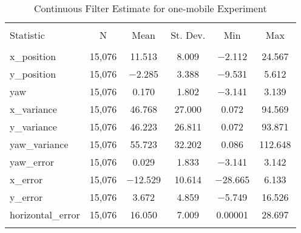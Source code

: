 
\begin{table}[h] \centering 
  \caption{Continuous Filter Estimate for one-mobile Experiment} 
  \label{tab:one_mobile_continuous_summary} 
\begin{tabular}{@{\extracolsep{5pt}}lccccc} 
\\[-1.8ex]\hline 
\hline \\[-1.8ex] 
Statistic & \multicolumn{1}{c}{N} & \multicolumn{1}{c}{Mean} & \multicolumn{1}{c}{St. Dev.} & \multicolumn{1}{c}{Min} & \multicolumn{1}{c}{Max} \\ 
\hline \\[-1.8ex] 
x\_position & 15,076 & \num{11.513} & \num{8.009} & $-$2.112 & \num{24.567} \\ 
y\_position & 15,076 & $-$2.285 & \num{3.388} & $-$9.531 & \num{5.612} \\ 
yaw & 15,076 & \num{0.170} & \num{1.802} & $-$3.141 & \num{3.139} \\ 
x\_variance & 15,076 & \num{46.768} & \num{27.000} & \num{0.072} & \num{94.569} \\ 
y\_variance & 15,076 & \num{46.223} & \num{26.811} & \num{0.072} & \num{93.871} \\ 
yaw\_variance & 15,076 & \num{55.723} & \num{32.202} & \num{0.086} & \num{112.648} \\ 
yaw\_error & 15,076 & \num{0.029} & \num{1.833} & $-$3.141 & \num{3.142} \\ 
x\_error & 15,076 & $-$12.529 & \num{10.614} & $-$28.665 & \num{6.133} \\ 
y\_error & 15,076 & \num{3.672} & \num{4.859} & $-$5.749 & \num{16.526} \\ 
horizontal\_error & 15,076 & \num{16.050} & \num{7.009} & \num{0.00001} & \num{28.697} \\ 
\hline \\[-1.8ex] 
\end{tabular} 
\end{table} 
